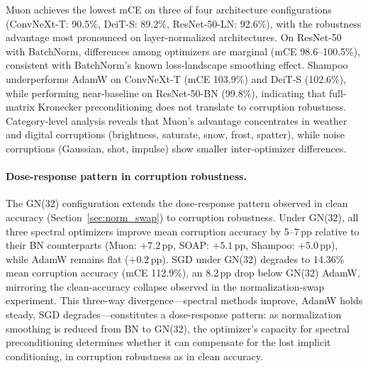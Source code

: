 Muon achieves the lowest mCE on three of four architecture configurations (ConvNeXt-T: 90.5\%, DeiT-S: 89.2\%, ResNet-50-LN: 92.6\%), with the robustness advantage most pronounced on layer-normalized architectures. On ResNet-50 with BatchNorm, differences among optimizers are marginal (mCE 98.6--100.5\%), consistent with BatchNorm's known loss-landscape smoothing effect. Shampoo underperforms AdamW on ConvNeXt-T (mCE 103.9\%) and DeiT-S (102.6\%), while performing near-baseline on ResNet-50-BN (99.8\%), indicating that full-matrix Kronecker preconditioning does not translate to corruption robustness. Category-level analysis reveals that Muon's advantage concentrates in weather and digital corruptions (brightness, saturate, snow, frost, spatter), while noise corruptions (Gaussian, shot, impulse) show smaller inter-optimizer differences.

\paragraph{Dose-response pattern in corruption robustness.}
The GN(32) configuration extends the dose-response pattern observed in clean accuracy (Section~\ref{sec:norm_swap}) to corruption robustness. Under GN(32), all three spectral optimizers improve mean corruption accuracy by 5--7\,pp relative to their BN counterparts (Muon: $+7.2$\,pp, SOAP: $+5.1$\,pp, Shampoo: $+5.0$\,pp), while AdamW remains flat ($+0.2$\,pp). SGD under GN(32) degrades to 14.36\% mean corruption accuracy (mCE 112.9\%), an 8.2\,pp drop below GN(32) AdamW, mirroring the clean-accuracy collapse observed in the normalization-swap experiment. This three-way divergence---spectral methods improve, AdamW holds steady, SGD degrades---constitutes a dose-response pattern: as normalization smoothing is reduced from BN to GN(32), the optimizer's capacity for spectral preconditioning determines whether it can compensate for the lost implicit conditioning, in corruption robustness as in clean accuracy.
